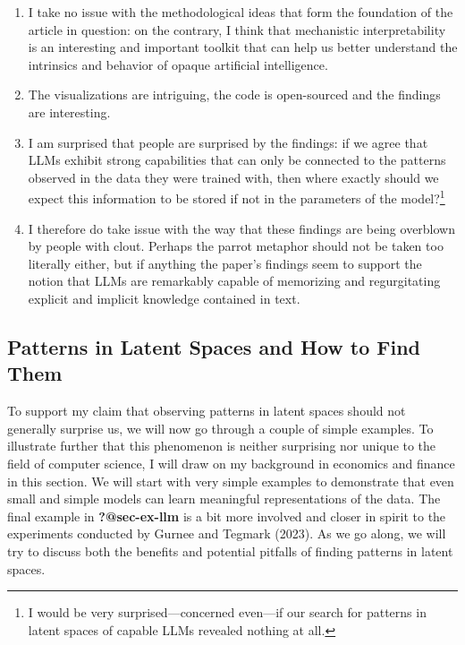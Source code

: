 \documentclass[
  letterpaper,
  DIV=11,
  numbers=noendperiod]{scrartcl}
\providecommand{\tightlist}{%
  \setlength{\itemsep}{0pt}\setlength{\parskip}{0pt}}\usepackage{longtable,booktabs,array}
\theoremstyle{plain}
\theoremstyle{remark}
\begin{document}
\begin{enumerate}
\def\labelenumi{\arabic{enumi}.}
\tightlist
\item
  I take no issue with the methodological ideas that form the foundation
  of the article in question: on the contrary, I think that mechanistic
  interpretability is an interesting and important toolkit that can help
  us better understand the intrinsics and behavior of opaque artificial
  intelligence.
\item
  The visualizations are intriguing, the code is open-sourced and the
  findings are interesting.
\item
  I am surprised that people are surprised by the findings: if we agree
  that LLMs exhibit strong capabilities that can only be connected to
  the patterns observed in the data they were trained with, then where
  exactly should we expect this information to be stored if not in the
  parameters of the model?\footnote{I would be very
    surprised---concerned even---if our search for patterns in latent
    spaces of capable LLMs revealed nothing at all.}
\item
  I therefore do take issue with the way that these findings are being
  overblown by people with clout. Perhaps the parrot metaphor should not
  be taken too literally either, but if anything the paper's findings
  seem to support the notion that LLMs are remarkably capable of
  memorizing and regurgitating explicit and implicit knowledge contained
  in text.
\end{enumerate}

\subsection{Patterns in Latent Spaces and How to Find
Them}\label{patterns-in-latent-spaces-and-how-to-find-them}

To support my claim that observing patterns in latent spaces should not
generally surprise us, we will now go through a couple of simple
examples. To illustrate further that this phenomenon is neither
surprising nor unique to the field of computer science, I will draw on
my background in economics and finance in this section. We will start
with very simple examples to demonstrate that even small and simple
models can learn meaningful representations of the data. The final
example in \textbf{?@sec-ex-llm} is a bit more involved and closer in
spirit to the experiments conducted by Gurnee and Tegmark (2023). As we
go along, we will try to discuss both the benefits and potential
pitfalls of finding patterns in latent spaces.
\end{document}
